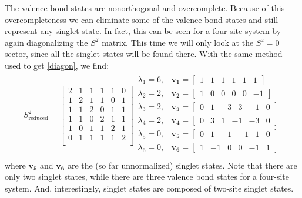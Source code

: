 The valence bond states are nonorthogonal and overcomplete.
Because of this overcompleteness we can eliminate some of the valence bond states and still
represent any singlet state.  
In fact, this can be seen for a four-site system by again diagonalizing the $S^2$ matrix.
This time we will only look at the $S^z=0$ sector, since all the singlet states will be found there.
With the same method used to get \eqref{diagon}, we find:
\begin{eqnarray}
S^2_{\text{reduced}} =\left[
\begin{array}{cccccc}
2&1&1&1&1&0\\
1&2&1&1&0&1\\
1&1&2&0&1&1\\
1&1&0&2&1&1\\
1&0&1&1&2&1\\
0&1&1&1&1&2\\
\end{array} \right] 
\begin{array}{cl}
\lambda_1=6,&\mathbf{v_1} =\left[\begin{array}{cccccc} 1&1&1&1&1&1\end{array} \right]\\
\lambda_2=2,&\mathbf{v_2} =\left[\begin{array}{cccccc} 1&0&0&0&0&-1\end{array} \right]\\
\lambda_3=2,&\mathbf{v_3} =\left[\begin{array}{cccccc} 0&1&-3&3&-1&0\end{array} \right]\\
\lambda_4=2,&\mathbf{v_4} =\left[\begin{array}{cccccc} 0&3&1&-1&-3&0\end{array} \right]\\
\lambda_5=0,&\mathbf{v_5} =\left[\begin{array}{cccccc} 0&1&-1&-1&1&0\end{array} \right]\\
\lambda_6=0,&\mathbf{v_6} =\left[\begin{array}{cccccc} 1&-1&0&0&-1&1\end{array} \right]\\
\end{array} 
\end{eqnarray}
where $\mathbf{v_5}$ and $\mathbf{v_6}$ are the (so far unnormalized) singlet states.
Note that there are only two singlet states, while there are three valence bond states
for a four-site system.
And, interestingly, singlet states are composed of two-site singlet states. 
